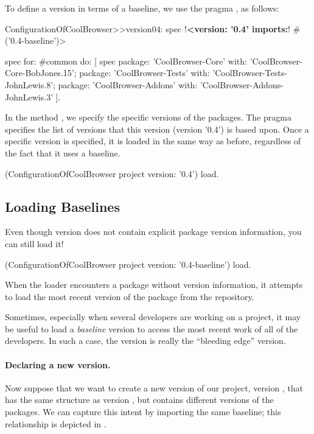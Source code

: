 \documentclass[a4paper,10pt,twoside]{book}
\begin{document}
To define a version in terms of a baseline, we use the pragma \mbox{}, as follows:

\begin{code}{}
ConfigurationOfCoolBrowser>>version04: spec 
      !\textbf{<version: '0.4' imports:}! #('0.4-baseline')>
       
      spec for: #common do: [
             spec 
                   package: 'CoolBrowser-Core' with: 'CoolBrowser-Core-BobJones.15';
                   package: 'CoolBrowser-Tests' with: 'CoolBrowser-Tests-JohnLewis.8';
                   package: 'CoolBrowser-Addons' with: 'CoolBrowser-Addons-JohnLewis.3' ].
\end{code}

In the method , we specify the specific versions of the packages. The pragma  specifies the list of versions that this version (version '0.4') is based upon. Once a specific version is specified, it is loaded in the same way as before, regardless of the fact that it uses a baseline.

\begin{code}{}
(ConfigurationOfCoolBrowser project version: '0.4') load.
\end{code}

\subsection{Loading Baselines}
Even though version  does not contain explicit package version information, you can still load it!   
\begin{code}{}
(ConfigurationOfCoolBrowser project version: '0.4-baseline') load.
\end{code}
\noindent
When the loader encounters a package without version information, it attempts to load the most recent version of the package from the repository.

Sometimes, especially when several developers are working on a project, it may be useful to load a \emph{baseline} version to access the most recent work of all of the developers.  In such a case, the  version is really the ``bleeding edge'' version.

\paragraph{Declaring a new version.}
Now suppose that we want to create a new version of our project, version , that has the same structure as version , but contains different  versions of the packages.  We can capture this intent by importing the same baseline; this relationship is depicted in .
\end{document}
